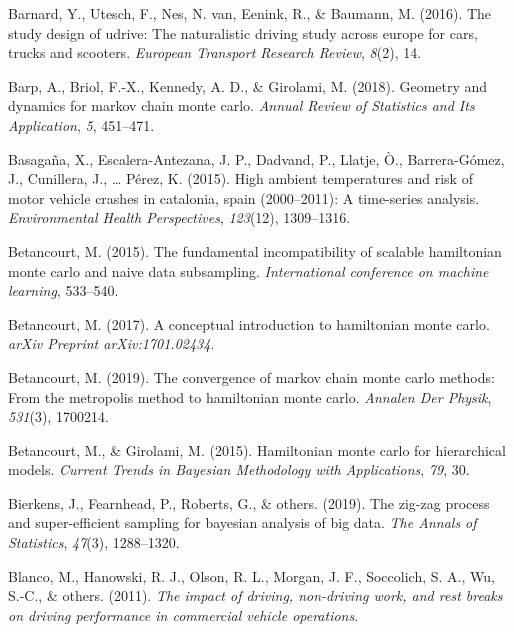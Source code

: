 \documentclass[12pt]{book}
\numberwithin{equation}{chapter}
\begin{document}
\leavevmode\hypertarget{ref-barnard2016study}{}%
Barnard, Y., Utesch, F., Nes, N. van, Eenink, R., \& Baumann, M. (2016). The study design of udrive: The naturalistic driving study across europe for cars, trucks and scooters. \emph{European Transport Research Review}, \emph{8}(2), 14.

\leavevmode\hypertarget{ref-barp2018geometry}{}%
Barp, A., Briol, F.-X., Kennedy, A. D., \& Girolami, M. (2018). Geometry and dynamics for markov chain monte carlo. \emph{Annual Review of Statistics and Its Application}, \emph{5}, 451--471.

\leavevmode\hypertarget{ref-basagana2015high}{}%
Basagaña, X., Escalera-Antezana, J. P., Dadvand, P., Llatje, Ò., Barrera-Gómez, J., Cunillera, J., \ldots{} Pérez, K. (2015). High ambient temperatures and risk of motor vehicle crashes in catalonia, spain (2000--2011): A time-series analysis. \emph{Environmental Health Perspectives}, \emph{123}(12), 1309--1316.

\leavevmode\hypertarget{ref-betancourt2015fundamental}{}%
Betancourt, M. (2015). The fundamental incompatibility of scalable hamiltonian monte carlo and naive data subsampling. \emph{International conference on machine learning}, 533--540.

\leavevmode\hypertarget{ref-betancourt2017conceptual}{}%
Betancourt, M. (2017). A conceptual introduction to hamiltonian monte carlo. \emph{arXiv Preprint arXiv:1701.02434}.

\leavevmode\hypertarget{ref-betancourt2019convergence}{}%
Betancourt, M. (2019). The convergence of markov chain monte carlo methods: From the metropolis method to hamiltonian monte carlo. \emph{Annalen Der Physik}, \emph{531}(3), 1700214.

\leavevmode\hypertarget{ref-betancourt2015hamiltonian}{}%
Betancourt, M., \& Girolami, M. (2015). Hamiltonian monte carlo for hierarchical models. \emph{Current Trends in Bayesian Methodology with Applications}, \emph{79}, 30.

\leavevmode\hypertarget{ref-bierkens2019zig}{}%
Bierkens, J., Fearnhead, P., Roberts, G., \& others. (2019). The zig-zag process and super-efficient sampling for bayesian analysis of big data. \emph{The Annals of Statistics}, \emph{47}(3), 1288--1320.

\leavevmode\hypertarget{ref-blanco2011impact}{}%
Blanco, M., Hanowski, R. J., Olson, R. L., Morgan, J. F., Soccolich, S. A., Wu, S.-C., \& others. (2011). \emph{The impact of driving, non-driving work, and rest breaks on driving performance in commercial vehicle operations}.
\end{document}
